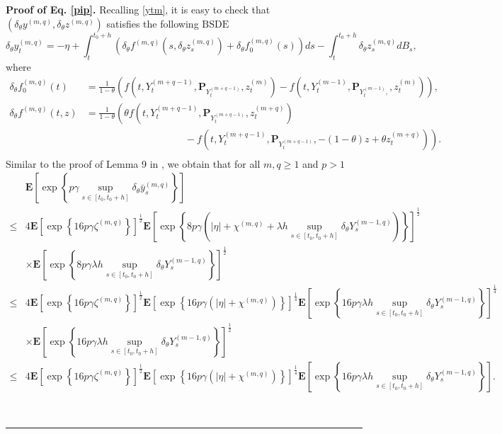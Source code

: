 \documentclass[10pt]{article}%
\numberwithin{equation}{section}
\newenvironment{proof}[1][Proof]{\noindent \textbf{#1.} }{\  \rule{0.5em}{0.5em}}
\begin{document}
\begin{proof}[Proof of Eq. \eqref{pip}]
 Recalling \eqref{ytm}, it is easy to check that $\left(\delta_\theta y^{(m, q)}, \delta_\theta z^{(m, q)}\right)$
satisfies the following $\text{BSDE}$
$$
\delta_\theta y_t^{(m, q)}=-\eta+\int_t^{t_0+h}\left(\delta_\theta f^{(m, q)}\left(s, \delta_\theta z_s^{(m, q)}\right)+\delta_\theta f_0^{(m, q)}(s)\right) d s-\int_t^{t_0+h} \delta_\theta z_s^{(m, q)} d B_s,
$$
where
$$
\begin{aligned} 
 \delta_\theta f_0^{(m, q)}(t)&= \frac{1}{1-\theta}\left(f\left(t, Y_t^{(m+q-1)}, \mathbf{P}_{Y_t^{(m+q-1)}}, z_t^{(m)}\right)-f\left(t, Y_t^{(m-1)}, \mathbf{P}_{Y_t^{(m-1)},}, z_t^{(m)}\right)\right), \\
\delta_\theta f^{(m, q)}(t, z)&=  \frac{1}{1-\theta}\left(\theta f\left(t, Y_t^{(m+q-1)}, \mathbf{P}_{Y_t^{(m+q-1)}}, z_t^{(m+q)}\right)\right. \\
& \left.\qquad \qquad \qquad \qquad \qquad-f\left(t, Y_t^{(m+q-1)}, \mathbf{P}_{Y_t^{(m+q-1)}},-(1-\theta) z+\theta z_t^{(m+q)}\right)\right) .\\
\end{aligned}
$$   
Similar to the proof of Lemma 9 in \cite{HMW}, we  obtain that for all $m,q \geq 1$ and $p>1$ 
$$
\begin{aligned}
& \mathbf{E} \left[\exp\left\{p\gamma\sup_{s\in[t_0,t_0+h]}\delta_{\theta}\bar{y}_s^{(m,q)}\right\}\right] \\ 
\leq& 4\mathbf{E}\left[\exp\left\{16p\gamma\zeta^{(m, q)} \right\}\right]^{\frac{1}{2}}\mathbf{E}\left[\exp\left\{8p\gamma\left(|\eta|+\chi^{(m, q)}+\lambda h\sup _{s \in[t_0, t_0+h]} \delta_\theta Y_s^{(m-1, q)}\right)\right\}\right]^{\frac{1}{2}}\\
& \times \mathbf{E}\left[\exp\left\{8p\gamma\lambda h\sup _{s \in[t_0, t_0+h]}\delta_\theta Y_s^{(m-1, q)}\right\}\right]^{\frac{1}{2}} \\
\leq &4\mathbf{E}\left[\exp\left\{16p\gamma\zeta^{(m, q)} \right\}\right]^{\frac{1}{2}}\mathbf{E}\left[\exp\left\{16p\gamma\left(|\eta|+\chi^{(m, q)}\right)\right\}\right]^{\frac{1}{4}}\mathbf{E}\left[\exp\left\{16p\gamma\lambda h\sup _{s \in[t_0, t_0+h]}\delta_\theta Y_s^{(m-1, q)}\right\}\right]^{\frac{1}{4}}\\
& \times \mathbf{E}\left[\exp\left\{16p\gamma\lambda h\sup _{s \in[t_0, t_0+h]}\delta_\theta Y_s^{(m-1, q)}\right\}\right]^{\frac{1}{2}} \\
\leq&4\mathbf{E}\left[\exp\left\{16p\gamma\zeta^{(m, q)} \right\}\right]^{\frac{1}{2}}\mathbf{E}\left[\exp\left\{16p\gamma\left(|\eta|+\chi^{(m, q)}\right)\right\}\right]^{\frac{1}{4}}\mathbf{E}\left[\exp\left\{16p\gamma\lambda h\sup _{s \in[t_0, t_0+h]}\delta_\theta Y_s^{(m-1, q)}\right\}\right].
\end{aligned}
$$


\end{proof}
\end{document}
